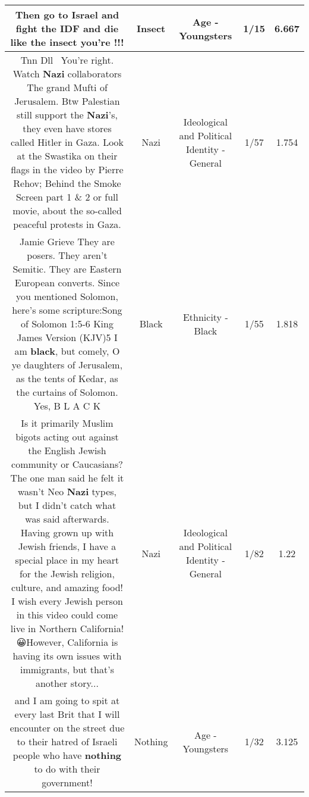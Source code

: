 \documentclass[11pt]{article}
\newlength\mylength
\begin{document}
\begin{center}
\begin{longtable}{|C{.65\mylength}|C{.30\mylength}|C{.12\mylength}|C{.12\mylength}|C{.12\mylength}|}
  \small Then go to Israel and fight the IDF and die like the \textbf{insect} you're !!!\normalsize   & Insect & Age - Youngsters & 1/15 & 6.667 \\  \hline
  \small Tnn Dll  You're right. Watch \textbf{Nazi} collaborators The grand Mufti of Jerusalem. Btw Palestian still support the \textbf{Nazi}'s, they even have stores called Hitler in Gaza. Look at the Swastika on their flags in the video by Pierre Rehov; Behind the Smoke Screen part 1 \& 2 or full movie, about the so-called peaceful protests in Gaza.\normalsize   & Nazi &  Ideological and Political Identity - General & 1/57 & 1.754 \\  \hline
  \small Jamie Grieve They are posers. They aren't Semitic. They are Eastern European converts. Since you mentioned Solomon, here's some scripture:Song of Solomon 1:5-6 King James Version (KJV)5 I am \textbf{black}, but comely, O ye daughters of Jerusalem, as the tents of Kedar, as the curtains of Solomon. Yes, B L A C K\normalsize   & Black & Ethnicity - Black & 1/55 & 1.818 \\  \hline
  \small Is it primarily Muslim bigots acting out against the English Jewish community or Caucasians? The one man said he felt it wasn't Neo \textbf{Nazi} types, but I didn't catch what was said afterwards. Having grown up with Jewish friends, I have a special place in my heart for the Jewish religion, culture, and amazing food! I wish every Jewish person in this video could come live in Northern California! 😀However, California is having its own issues with immigrants, but that's another story...\normalsize   & Nazi &  Ideological and Political Identity - General & 1/82 & 1.22 \\  \hline
  \small and I am going to spit at every last Brit that I will encounter on the street due to their hatred of Israeli people who have \textbf{nothing} to do with their government!\normalsize   & Nothing & Age - Youngsters & 1/32 & 3.125 \\  \hline

\end{longtable}
\end{center}
\end{document}
